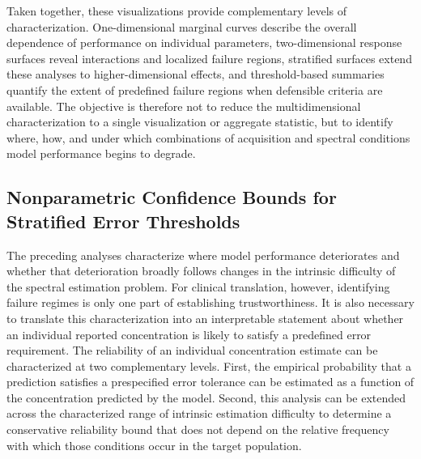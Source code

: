 Taken together, these visualizations provide complementary levels of characterization. One-dimensional marginal curves describe the overall dependence of performance on individual parameters, two-dimensional response surfaces reveal interactions and localized failure regions, stratified surfaces extend these analyses to higher-dimensional effects, and threshold-based summaries quantify the extent of predefined failure regions when defensible criteria are available. The objective is therefore not to reduce the multidimensional characterization to a single visualization or aggregate statistic, but to identify where, how, and under which combinations of acquisition and spectral conditions model performance begins to degrade. 

\subsection{Nonparametric Confidence Bounds for Stratified Error Thresholds}
\label{sec:Reg:subsec:pred_intervals}
The preceding analyses characterize where model performance deteriorates and whether that deterioration broadly follows changes in the intrinsic difficulty of the spectral estimation problem. For clinical translation, however, identifying failure regimes is only one part of establishing trustworthiness. It is also necessary to translate this characterization into an interpretable statement about whether an individual reported concentration is likely to satisfy a predefined error requirement. The reliability of an individual concentration estimate can be characterized at two complementary levels. First, the empirical probability that a prediction satisfies a prespecified error tolerance can be estimated as a function of the concentration predicted by the model. Second, this analysis can be extended across the characterized range of intrinsic estimation difficulty to determine a conservative reliability bound that does not depend on the relative frequency with which those conditions occur in the target population.

